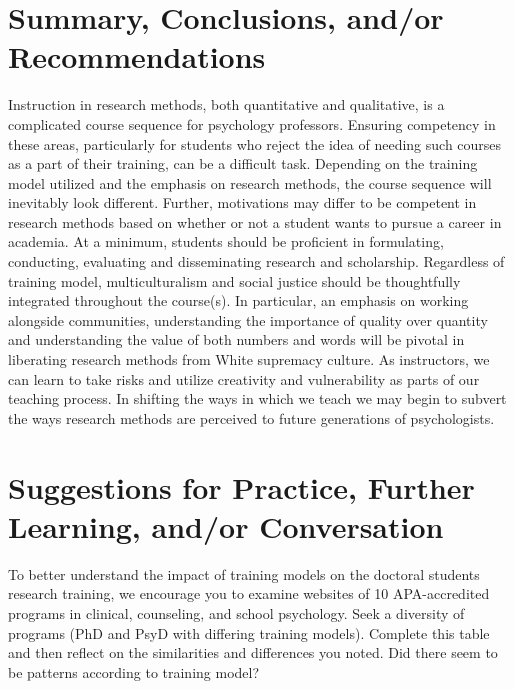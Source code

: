 \documentclass[
  11pt,
]{book}
\begin{document}
\section{Summary, Conclusions, and/or Recommendations}\label{summary-conclusions-andor-recommendations}

Instruction in research methods, both quantitative and qualitative, is a complicated course sequence for psychology professors. Ensuring competency in these areas, particularly for students who reject the idea of needing such courses as a part of their training, can be a difficult task. Depending on the training model utilized and the emphasis on research methods, the course sequence will inevitably look different. Further, motivations may differ to be competent in research methods based on whether or not a student wants to pursue a career in academia. At a minimum, students should be proficient in formulating, conducting, evaluating and disseminating research and scholarship. Regardless of training model, multiculturalism and social justice should be thoughtfully integrated throughout the course(s). In particular, an emphasis on working alongside communities, understanding the importance of quality over quantity and understanding the value of both numbers and words will be pivotal in liberating research methods from White supremacy culture. As instructors, we can learn to take risks and utilize creativity and vulnerability as parts of our teaching process. In shifting the ways in which we teach we may begin to subvert the ways research methods are perceived to future generations of psychologists.

\section{Suggestions for Practice, Further Learning, and/or Conversation}\label{suggestions-for-practice-further-learning-andor-conversation}

To better understand the impact of training models on the doctoral students research training, we encourage you to examine websites of 10 APA-accredited programs in clinical, counseling, and school psychology. Seek a diversity of programs (PhD and PsyD with differing training models). Complete this table and then reflect on the similarities and differences you noted. Did there seem to be patterns according to training model?
\end{document}
